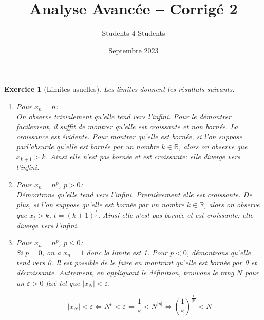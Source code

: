 \documentclass{article}
\title{\textbf{Analyse Avancée -- Corrigé 2}}
\author{Students 4 Students}
\date{Septembre 2023}
\newcommand{\Rr}{{\mathbb{R}}}
\theoremstyle{exercice}
\newtheorem{exercice}{Exercice}
\begin{document}
\pagestyle{fancy}

\maketitle



\begin{exercice}[Limites usuelles]
    Les limites donnent les résultats suivants:
\begin{enumerate}
    \item Pour $x_n=n$: \\
    On observe trivialement qu'elle tend vers l'infini. Pour le démontrer facilement, il suffit de montrer qu'elle est croissante et non bornée. La croissance est évidente. Pour montrer qu'elle est bornée, si l'on suppose parl'absurde qu'elle est bornée par un nombre $k\in \Rr$, alors on observe que $x_{k+1}>k$. Ainsi elle n'est pas bornée et est croissante: elle diverge vers l'infini.
    \item Pour $x_n=n^p$, $p>0$: \\
    Démontrons qu'elle tend vers l'infini. Premièrement elle est croissante. De plus, si l'on suppose qu'elle est bornée par un nombre $k\in \Rr$, alors on observe que $x_{t}>k$, $t=(k+1)^\tfrac{1}{p}$. Ainsi elle n'est pas bornée et est croissante: elle diverge vers l'infini.
    \item Pour $x_n=n^p$, $p\leq0$: \\
    Si $p=0$, on a $x_n=1$ donc la limite est 1.
    Pour $p<0$, démontrons qu'elle tend vers 0. Il est possible de le faire en montrant qu'elle est bornée par 0 et décroissante. Autrement, en appliquant le définition, trouvons le rang $N$ pour un $\varepsilon>0$ fixé tel que $|x_N|<\varepsilon$.

    \begin{equation}
    |x_N|<\varepsilon \iff N^p<\varepsilon \iff \frac{1}{\varepsilon}<N^{|p|}\iff \left( \frac{1}{\varepsilon}\right)^{\tfrac{1}{|p|}} <N
    \end{equation}
    

\end{enumerate}
\end{exercice}
\end{document}
